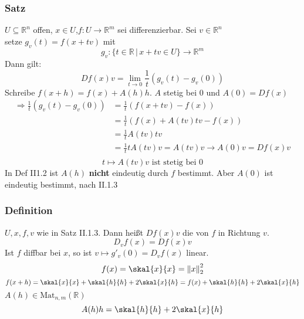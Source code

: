 \subsubsection{Satz} %
\label{ssub:satz}
$U \subseteq \mathbb{R}^n$ offen, $x \in U$,$f: U \to \mathbb{R}^m$ sei differenzierbar. Sei $v \in \mathbb{R}^n$ \\
setze $g_v(t)=f(x+tv)$ mit 
\[
	g_v:\{t \in \mathbb{R} \,|\,x+tv \in U \} \to \mathbb{R}^m
\]
Dann gilt:
\[
	Df(x)v = \lim_{t \to 0} \frac{1}{t}(g_v(t)-g_v(0))
\]
Schreibe $f(x+h)=f(x)+A(h)h$. $A$ stetig bei $0$ und $A(0)=Df(x)$
\begin{align*}
	\Rightarrow \frac{1}{t}(g_v(t)-g_v(0))&= \frac{1}{t}(f(x+tv)-f(x))  \\
	&= \frac{1}{t}(f(x)+A(tv)tv-f(x)) \\
	&= \frac{1}{t}A(tv)tv \\
	&= \frac{1}{t}tA(tv)v = A(tv)v \longrightarrow A(0)v = Df(x)v \\
\end{align*}
\[
	t \mapsto A(tv)v \text{ ist stetig bei $0$}
\] \bewende
{}
In Def II1.2 ist $A(h)$ { \bfseries nicht} eindeutig durch $f$ bestimmt. Aber $A(0)$ ist eindeutig bestimmt, nach II.1.3
\subsubsection{Definition} %
\label{ssub:definition}
$U,x,f,v$ wie in Satz II.1.3. Dann heißt $Df(x)v$ die  von $f$ in Richtung $v$.
\[
	D_vf(x)=Df(x)v
\] 
Ist $f$ diffbar bei $x$, so ist $v \mapsto g'_v(0)=D_vf(x)$ linear.
\[
	f(x)=\skal{x}{x}=\norm{x}_2^2
\]
\[
	f(x+h)=\skal{x}{x}+\skal{h}{h}+2\skal{x}{h}=f(x)+\skal{h}{h}+2\skal{x}{h}
\]
$A(h) \in \text{Mat}_{n,m}(\mathbb{R})$
\[
	A(h)h= \skal{h}{h}+2 \skal{x}{h}   
\]
